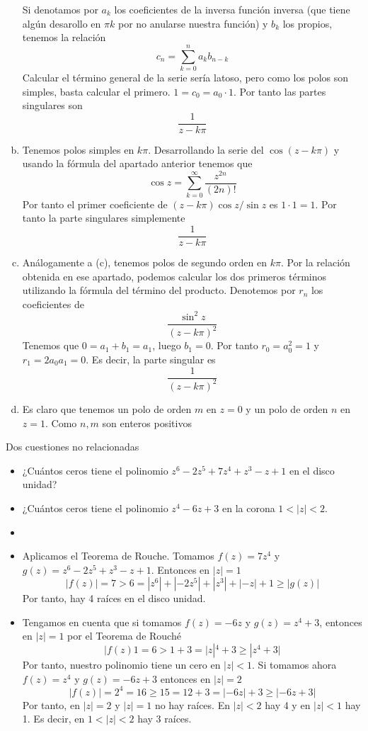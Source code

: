 \documentclass[twoside]{article}
\begin{document}
\begin{solucion}
\begin{enumerate}[(a)]
Si denotamos por $a_k$ los coeficientes de la inversa función inversa (que tiene algún desarollo en $\pi k$ por no anularse nuestra función) y $b_k$ los propios, tenemos la relación
$$
c_n = \sum_{k=0}^{n}a_k b_{n-k}
$$
Calcular el término general de la serie sería latoso, pero como los polos son simples, basta calcular el primero.  $1 = c_0 = a_0 \cdot 1$. Por tanto las partes singulares son 
$$
\frac{1}{z-k\pi}
$$
\item Tenemos polos simples en $k\pi$. Desarrollando la serie del $\cos(z-k\pi)$ y usando la fórmula del apartado anterior tenemos que
$$
\cos z = \sum_{k=0}^\infty \frac{z^{2n}}{(2n)!}
$$
Por tanto el primer coeficiente de $(z-k\pi) \cos z / \sin z$ es $1 \cdot 1 = 1$. Por tanto la parte singulares simplemente
$$\frac{1}{z-k\pi}
$$
\item Análogamente a (c), tenemos polos de segundo orden en $k\pi$. Por la relación obtenida en ese apartado, podemos calcular los dos primeros términos utilizando la fórmula del término del producto. Denotemos por $r_n$ los coeficientes de 
$$\frac{\sin^2 z}{(z-k\pi)^2}$$
Tenemos que $0 = a_1 + b_1 = a_1 $, luego $b_1= 0$. Por tanto $r_0 = a_0^2 = 1$ y $r_1= 2 a_0a_1 = 0$. Es decir, la parte singular es
$$
\frac{1}{(z-k\pi)^2}
$$
\item Es claro que tenemos un polo de orden $m$ en $z=0$ y un polo de orden $n$ en $z=1$. Como $n,m$ son enteros positivos 
\end{enumerate}
\end{solucion}
\newpage

\begin{ejercicio}{2}
Dos cuestiones no relacionadas
\begin{itemize}
\item ¿Cuántos ceros tiene el polinomio $z^6-2z^5 +7z^4+z^3-z+1$ en el disco unidad?
\item ¿Cuántos ceros tiene el polinomio $z^4-6z+3$ en la corona $1<|z|<2$.
\end{itemize}
\end{ejercicio}
\begin{solucion}
\begin{itemize}
\item[]
\item Aplicamos el Teorema de Rouche. Tomamos $f(z)=7z^4$ y $g(z)=z^6-2z^5+z^3-z+1$. Entonces en $|z|=1$
$$
|f(z)| = 7 > 6 = |z^6| + |-2z^5| + |z^3| + |-z| +1 \geq |g(z)|
$$
Por tanto, hay 4 raíces en el disco unidad.
\item  Tengamos en cuenta que si tomamos $f(z)=-6z$ y $g(z)=z^4+3$, entonces en $|z|=1$ por el Teorema de Rouché
$$
|f(z)1 = 6 > 1+3 = |z|^4+ 3 \geq |z^4+3|
$$
Por tanto, nuestro polinomio tiene un cero en $|z|<1$. Si tomamos ahora $f(z)=z^4$ y $g(z)=-6z+3$ entonces en $|z|=2$
$$
|f(z)| = 2^4 = 16 \geq 15 = 12 + 3 = |-6z| + 3 \geq |-6z+3|
$$
Por tanto, en $|z|=2$ y $|z|=1$ no hay raíces. En $|z|<2$ hay 4 y en $|z|<1$ hay 1. Es decir, en $1<|z|<2$ hay 3 raíces.
\end{itemize}
\end{solucion}
\newpage
\end{document}
